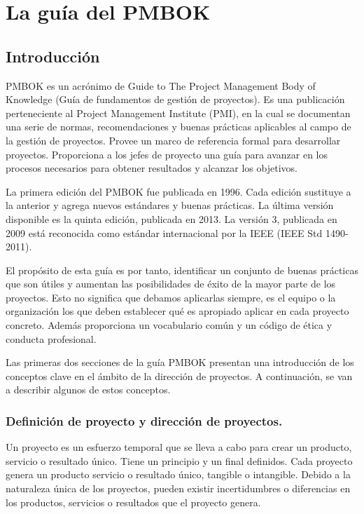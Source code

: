\newpage{}
\section{La guía del PMBOK}

\subsection{Introducción}

PMBOK es un acrónimo de Guide to The Project Management Body of Knowledge (Guía de fundamentos de gestión de proyectos). Es una publicación perteneciente al Project Management Institute (PMI), en la cual se documentan una serie de normas, recomendaciones y buenas prácticas aplicables al campo de la gestión de proyectos. Provee un marco de referencia formal para desarrollar proyectos. Proporciona a los jefes de proyecto una guía para avanzar en los procesos necesarios para obtener resultados y alcanzar los objetivos. 

La primera edición del PMBOK fue publicada en 1996. Cada edición sustituye a la anterior y agrega nuevos estándares y buenas prácticas. La última versión disponible es la quinta edición, publicada en 2013. La versión 3, publicada en 2009 está reconocida como estándar internacional por la IEEE (IEEE Std 1490-2011).

El propósito de esta guía es por tanto, identificar un conjunto de buenas prácticas que son útiles y aumentan las posibilidades de éxito de la mayor parte de los proyectos. Esto no significa que debamos aplicarlas siempre, es el equipo o la organización los que deben establecer qué es apropiado aplicar en cada proyecto concreto. Además proporciona un vocabulario común y un código de ética y conducta profesional.

Las primeras dos secciones de la guía PMBOK presentan una introducción de los conceptos clave en el ámbito de la dirección de proyectos. A continuación, se van a describir algunos de estos conceptos.

\subsubsection{Definición de proyecto y dirección de proyectos.}

Un proyecto es un esfuerzo temporal que se lleva a cabo para crear un producto, servicio o resultado único. Tiene un principio y un final definidos. Cada proyecto genera un producto servicio o resultado único, tangible o intangible. Debido a la naturaleza única de los proyectos, pueden existir incertidumbres o diferencias en los productos, servicios o resultados que el proyecto genera.

